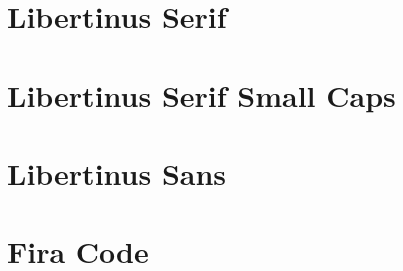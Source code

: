 \documentclass[ngerman]{scrartcl}
\begin{document}
\section{Libertinus Serif}
{\rmfamily\blindtext}

\section{Libertinus Serif Small Caps}
\textsc{\blindtext}

\section{Libertinus Sans}
{\sffamily\blindtext}

\section{Fira Code}
{\ttfamily\blindtext}
\end{document}
